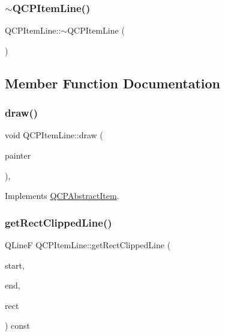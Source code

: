 \subsubsection{\texorpdfstring{$\sim$QCPItemLine()}{~QCPItemLine()}}
{\footnotesize\ttfamily Q\+C\+P\+Item\+Line\+::$\sim$\+Q\+C\+P\+Item\+Line (\begin{DoxyParamCaption}{ }\end{DoxyParamCaption})\hspace{0.3cm}{\ttfamily [virtual]}}



\subsection{Member Function Documentation}
\mbox{\label{class_q_c_p_item_line_ae184140b61b2ef5b8edde76304447200}} 
\subsubsection{\texorpdfstring{draw()}{draw()}}
{\footnotesize\ttfamily void Q\+C\+P\+Item\+Line\+::draw (\begin{DoxyParamCaption}\item[{\mbox{\hyperlink{class_q_c_p_painter}{Q\+C\+P\+Painter}} $\ast$}]{painter }\end{DoxyParamCaption})\hspace{0.3cm}{\ttfamily [protected]}, {\ttfamily [virtual]}}



Implements \mbox{\hyperlink{class_q_c_p_abstract_item_a007fdab79c935a5da5aa04a21d268c18}{Q\+C\+P\+Abstract\+Item}}.

\mbox{\label{class_q_c_p_item_line_a7b00a1d82be8b961461cc4039acd12a3}} 
\subsubsection{\texorpdfstring{getRectClippedLine()}{getRectClippedLine()}}
{\footnotesize\ttfamily Q\+LineF Q\+C\+P\+Item\+Line\+::get\+Rect\+Clipped\+Line (\begin{DoxyParamCaption}\item[{const \mbox{\hyperlink{class_q_c_p_vector2_d}{Q\+C\+P\+Vector2D}} \&}]{start,  }\item[{const \mbox{\hyperlink{class_q_c_p_vector2_d}{Q\+C\+P\+Vector2D}} \&}]{end,  }\item[{const Q\+Rect \&}]{rect }\end{DoxyParamCaption}) const\hspace{0.3cm}{\ttfamily [protected]}}

